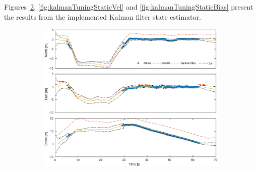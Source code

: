 Figures~\ref{fig:kalmanTuningStaticPos}, \ref{fig:kalmanTuningStaticVel} and \ref{fig:kalmanTuningStaticBias} present the results from the implemented Kalman filter state estimator.
\begin{figure}
\centering
	\begin{subfigure}{.82\textwidth}
		\includegraphics[width=\textwidth]{img/plot/static/kalmanTuningStaticPos.eps}
		\label{fig:kalmanTuningStaticPos}
	\end{subfigure}


\end{figure}
